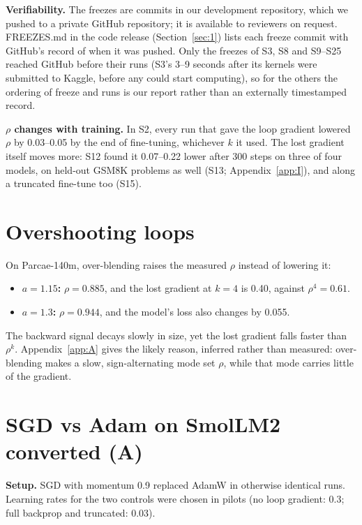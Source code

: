 \documentclass[10pt]{article}
\begin{document}
\textbf{Verifiability.} The freezes are commits in our development repository, which we pushed to a private GitHub repository; it is available to reviewers on request. FREEZES.md in the code release (Section~\ref{sec:1}) lists each freeze commit with GitHub's record of when it was pushed. Only the freezes of S3, S8 and S9--S25 reached GitHub before their runs (S3's 3--9 seconds after its kernels were submitted to Kaggle, before any could start computing), so for the others the ordering of freeze and runs is our report rather than an externally timestamped record.

\textbf{$\rho$ changes with training.} In S2, every run that gave the loop gradient lowered $\rho$ by 0.03--0.05 by the end of fine-tuning, whichever $k$ it used. The lost gradient itself moves more: S12 found it 0.07--0.22 lower after 300 steps on three of four models, on held-out GSM8K problems as well (S13; Appendix~\ref{app:I}), and along a truncated fine-tune too (S15).

\section{Overshooting loops}\label{app:C}

On Parcae-140m, over-blending raises the measured $\rho$ instead of lowering it:

\begin{itemize}
\item \textbf{$a = 1.15$:} $\rho = 0.885$, and the lost gradient at $k = 4$ is 0.40, against $\rho^{4} = 0.61$.
\item \textbf{$a = 1.3$:} $\rho = 0.944$, and the model's loss also changes by 0.055.
\end{itemize}

The backward signal decays slowly in size, yet the lost gradient falls faster than $\rho^{k}$. Appendix~\ref{app:A} gives the likely reason, inferred rather than measured: over-blending makes a slow, sign-alternating mode set $\rho$, while that mode carries little of the gradient.

\section{SGD vs Adam on SmolLM2 converted (A)}\label{app:D}

\textbf{Setup.} SGD with momentum 0.9 replaced AdamW in otherwise identical runs. Learning rates for the two controls were chosen in pilots (no loop gradient: 0.3; full backprop and truncated: 0.03).
\end{document}
